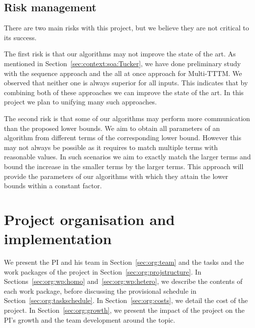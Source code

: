 \documentclass[a4paper,11pt]{article}
\begin{document}
	\subsection{Risk management}
	\label{sec:context:risk}
	
	There are two main risks with this project, but we believe they are not critical to its success.
	
	The first risk is that our algorithms may not improve the state of the art. As mentioned in Section~\ref{sec:context:soa:Tucker}, we have done preliminary study with the sequence approach and the all at once approach for Multi-TTTM. We observed that neither one is always superior for all inputs. This indicates that by combining both of these approaches we can improve the state of the art. In this project we plan to unifying many such approaches.
	
	The second risk is that some of our algorithms may perform more communication than the proposed lower bounds. We aim to obtain all parameters of an algorithm from different terms of the corresponding lower bound. However this may not always be possible as it requires to match multiple terms with reasonable values. In such scenarios we aim to exactly match the larger terms and bound the increase in the smaller terms by the larger terms. This approach will provide the parameters of our algorithms with which they attain the lower bounds within a constant factor.
	





	\section{Project organisation and implementation}
	\label{sec:org}
	 We present the PI and his team in Section~\ref{sec:org:team} and the tasks and the work packages of the project in Section~\ref{sec:org:projstructure}. In Sections~\ref{sec:org:wp:homo} and~\ref{sec:org:wp:hetero}, we describe the contents of each work package, before discussing the provisional schedule in Section~\ref{sec:org:taskschedule}. In Section~\ref{sec:org:costs}, we detail the cost of the project. In Section~\ref{sec:org:growth}, we present the impact of the project on the PI's growth and the team development around the topic.
\end{document}
